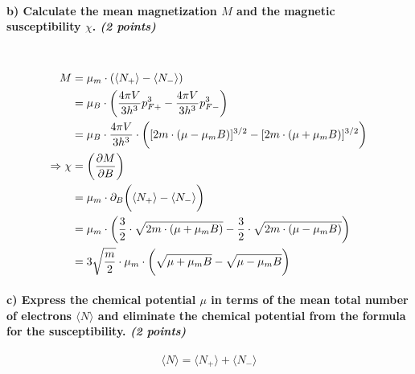 \paragraph{b) Calculate the mean magnetization $M$ and the magnetic 
    susceptibility $\chi$. \textit{(2 points)}
} \ \\
    \begin{align}
        M
        &=\mu_m\cdot(\langle N_+\rangle-\langle N_-\rangle) \\
        &=\mu_B\cdot\bigg(
            \frac{4\pi V}{3h^3}p_{F+}^3-
            \frac{4\pi V}{3h^3}p_{F-}^3
        \bigg) \\
        &=\mu_B\cdot\frac{4\pi V}{3h^3}\cdot\bigg(
            [2m\cdot(\mu-\mu_mB)]^{3/2}-
            [2m\cdot(\mu+\mu_mB)]^{3/2}
        \bigg) \\
        \Rightarrow\chi
        &=\bigg(\frac{\partial M}{\partial B}\bigg) \\
        &=\mu_m\cdot\partial_B\bigg(
            \langle N_+\rangle-\langle N_-\rangle
        \bigg) \\
        &=\mu_m\cdot\bigg(
            \frac{3}{2}\cdot\sqrt{2m\cdot(\mu+\mu_mB)}
            -\frac{3}{2}\cdot\sqrt{2m\cdot(\mu-\mu_mB)}
        \bigg) \\
        &=3\sqrt{\frac{m}{2}}\cdot\mu_m\cdot\bigg(
            \sqrt{\mu+\mu_mB}-\sqrt{\mu-\mu_mB}
        \bigg) 
    \end{align}


\paragraph{c) Express the chemical potential $\mu$ in terms of the 
    mean total number of electrons $\langle N\rangle$ and 
    eliminate the chemical potential from the formula 
    for the susceptibility. \textit{(2 points)}
}
    \begin{equation}
        \langle N\rangle
        =\langle N_+\rangle+\langle N_-\rangle
    \end{equation}
